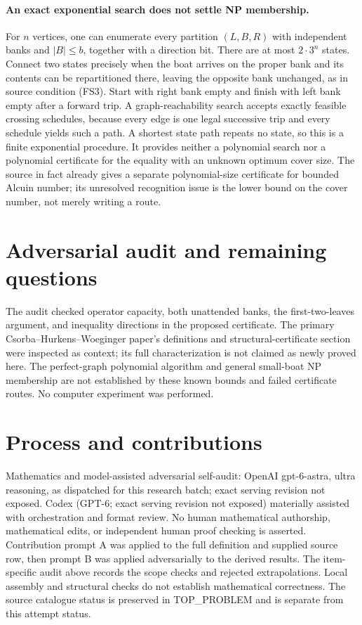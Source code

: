 \documentclass[11pt]{article}
\begin{document}
\paragraph{An exact exponential search does not settle NP membership.}
For $n$ vertices, one can enumerate every partition $(L,B,R)$ with
independent banks and $|B|\le b$, together with a direction bit.
There are at most $2\cdot3^n$ states. Connect two states precisely when
the boat arrives on the proper bank and its contents can be repartitioned
there, leaving the opposite bank unchanged, as in source condition (FS3).
Start with right bank empty and finish with left bank empty after a forward
trip. A graph-reachability search accepts exactly feasible crossing schedules,
because every edge is one legal successive trip and every schedule yields
such a path. A shortest state path repeats no state, so this is a finite
exponential procedure. It provides neither a polynomial search nor a
polynomial certificate for the equality with an unknown optimum cover size.
The source in fact already gives a separate polynomial-size certificate for
bounded Alcuin number; its unresolved recognition issue is the lower bound
on the cover number, not merely writing a route.

\section{Adversarial audit and remaining questions}
The audit checked operator capacity, both unattended banks, the first-two-leaves
argument, and inequality directions in the proposed certificate. The primary
Csorba--Hurkens--Woeginger paper's definitions and structural-certificate
section were inspected as context; its full characterization is not claimed
as newly proved here. The perfect-graph polynomial algorithm and general
small-boat NP membership are not established by these known bounds and
failed certificate routes. No computer experiment was performed.

\section{Process and contributions}
Mathematics and model-assisted adversarial self-audit: OpenAI gpt-6-astra, ultra reasoning, as dispatched for this research batch; exact serving revision not exposed. Codex (GPT-6; exact serving revision not exposed) materially assisted with orchestration and format review. No human mathematical authorship, mathematical edits, or independent human proof checking is asserted.
Contribution prompt A was applied to the full definition and supplied source row, then prompt B was applied adversarially to the derived results. The item-specific audit above records the scope checks and rejected extrapolations. Local assembly and structural checks do not establish mathematical correctness. The source catalogue status is preserved in TOP\_PROBLEM and is separate from this attempt status.
\end{document}
